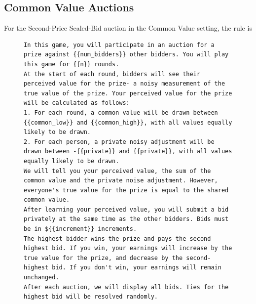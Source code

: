 \subsection{Common Value Auctions}

For the Second-Price Sealed-Bid auction in the Common Value setting, the rule is

\begin{figure}[H]
\centering
\begin{minipage}{0.95\textwidth}
\begin{lstlisting}
In this game, you will participate in an auction for a prize against {{num_bidders}} other bidders. You will play this game for {{n}} rounds. 
At the start of each round, bidders will see their perceived value for the prize- a noisy measurement of the true value of the prize. Your perceived value for the prize will be calculated as follows:
1. For each round, a common value will be drawn between {{common_low}} and {{common_high}}, with all values equally likely to be drawn.
2. For each person, a private noisy adjustment will be drawn between -{{private}} and {{private}}, with all values equally likely to be drawn.
We will tell you your perceived value, the sum of the common value and the private noise adjustment. However, everyone's true value for the prize is equal to the shared common value. 
After learning your perceived value, you will submit a bid privately at the same time as the other bidders. Bids must be in ${{increment}} increments. 
The highest bidder wins the prize and pays the second-highest bid. If you win, your earnings will increase by the true value for the prize, and decrease by the second-highest bid. If you don't win, your earnings will remain unchanged.
After each auction, we will display all bids. Ties for the highest bid will be resolved randomly.
\end{lstlisting}
\end{minipage}
\label{fig:sealbid_prompt}
\end{figure}


